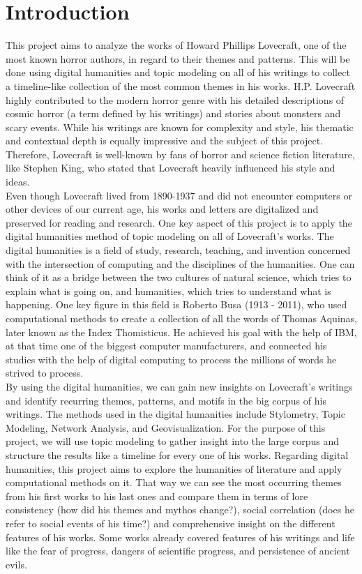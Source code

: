 \section{Introduction}

This project aims to analyze the works of Howard Phillips Lovecraft, one of the most known horror 
authors, in regard to their themes and patterns. This will be done using digital humanities and 
topic modeling on all of his writings to collect a timeline-like collection of the most common 
themes in his works. H.P. Lovecraft highly contributed to the modern horror genre with his 
detailed descriptions of cosmic horror (a term defined by his writings) and stories about 
monsters and scary events. While his writings are known for complexity and style, his thematic 
and contextual depth is equally impressive and the subject of this project. Therefore, Lovecraft 
is well-known by fans of horror and science fiction literature, like Stephen King, who stated 
that Lovecraft heavily influenced his style and ideas. \\

Even though Lovecraft lived from 1890-1937 and did not encounter computers or other devices of 
our current age, his works and letters are digitalized and preserved for reading and research. 
One key aspect of this project is to apply the digital humanities method of topic modeling on 
all of Lovecraft’s works. The digital humanities is a field of study, research, teaching, and 
invention concerned with the intersection of computing and the disciplines of the humanities. 
One can think of it as a bridge between the two cultures of natural science, which tries to 
explain what is going on, and humanities, which tries to understand what is happening. One key 
figure in this field is Roberto Busa (1913 - 2011), who used computational methods to create a 
collection of all the words of Thomas Aquinas, later known as the Index Thomisticus. He 
achieved his goal with the help of IBM, at that time one of the biggest computer manufacturers, 
and connected his studies with the help of digital computing to process the millions of words 
he strived to process.\\

By using the digital humanities, we can gain new insights on Lovecraft’s writings and identify 
recurring themes, patterns, and motifs in the big corpus of his writings. The methods used in 
the digital humanities include Stylometry, Topic Modeling, Network Analysis, and 
Geovisualization. For the purpose of this project, we will use topic modeling to gather 
insight into the large corpus and structure the results like a timeline for every one of 
his works. Regarding digital humanities, this project aims to explore the humanities of 
literature and apply computational methods on it. That way we can see the most occurring 
themes from his first works to his last ones and compare them in terms of lore consistency 
(how did his themes and mythos change?), social correlation (does he refer to social events 
of his time?) and comprehensive insight on the different features of his works. Some works 
already covered features of his writings and life like the fear of progress, dangers of 
scientific progress, and persistence of ancient evils.